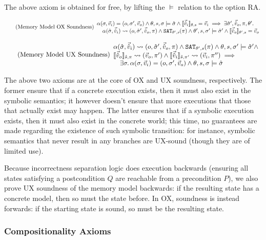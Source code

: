 The above axiom is obtained for free, by lifting the $\models$ relation to the option RA.

\begin{equation}
\tag{Memory Model OX Soundness}\label{eq:mem-ox-soundness}
\begin{array}{l}
\ppexecc{\alpha}{\st,\ins}{o,\st',\outs} \land \theta,s,\st\models\sst \land \expeval{\sins}=\ins \implies \exists \sst',\souts,\pc,\theta'\ldotp\\
\quad \ppexec{\alpha}{\sst,\sins}{o,\sst',\souts,\pc} \land \SAT[\theta',s](\pc) \land \theta',s,\st'\models \sst' \land  \expeval[\theta',s]{\souts}=\outs
\end{array}
\end{equation}

\begin{equation}
\tag{Memory Model UX Soundness}\label{eq:mem-ux-soundness}
\begin{array}{l}
\ppexec{\alpha}{\sst,\sins}{o,\sst',\souts,\pc} \land \SAT[\theta',s](\pc) \land \theta,s,\st'\models\sst' \land \\
\expeval[\sym s,\pc]{\souts}\rightsquigarrow(\outs,\pc')\land \expeval[\sym s,\pc']{\sins}\rightsquigarrow(\ins,\pc'')\implies\\
\quad \exists \st\ldotp \ppexecc{\alpha}{\st,\ins}{o,\st',\outs} \land \theta,s,\st\models\sst
\end{array}
\end{equation}

The above two axioms are at the core of OX and UX soundness, respectively. The former ensure that if a concrete execution exists, then it must also exist in the symbolic semantics; it however doesn't ensure that more executions that those that actually exist may happen. The latter ensures that if a symbolic execution exists, then it must also exist in the concrete world; this time, no guarantees are made regarding the existence of such symbolic transition: for instance, symbolic semantics that never result in any branches are UX-sound (though they are of limited use).

Because incorrectness separation logic does execution backwards (ensuring all states satisfying a postcondition $Q$ are reachable from a precondition $P$), we also prove UX soundness of the memory model backwards: if the resulting state has a concrete model, then so must the state before. In OX, soundness is instead forwards: if the starting state is sound, so must be the resulting state.

\subsubsection{Compositionality Axioms}

